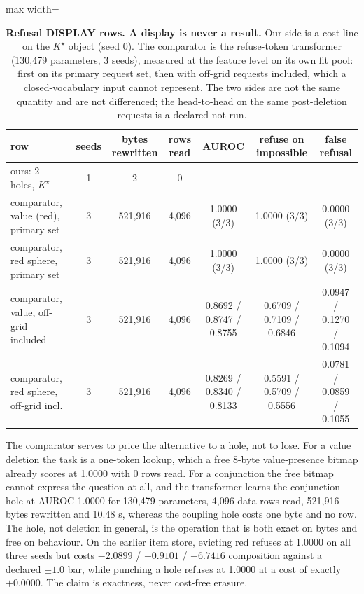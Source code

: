 \documentclass{article} %
\newcommand{\Kstar}{\ensuremath{K^{\star}}}
\begin{document}
\begin{table}[t]
\centering\small
\caption{\textbf{Refusal DISPLAY rows. A display is never a result.} Our side is a cost line
on the $\Kstar$ object (seed 0). The comparator is the refuse-token transformer (130,479
parameters, 3 seeds), measured at the feature level on its own fit pool: first on its primary
request set, then with off-grid requests included, which a closed-vocabulary input cannot
represent. The two sides are not the same quantity and are not differenced; the head-to-head on
the same post-deletion requests is a declared not-run.}
\label{tab:hole}
\setlength{\tabcolsep}{3pt}
\begin{adjustbox}{max width=\linewidth}\begin{tabular}{lcccccc}
\toprule
row & seeds & bytes rewritten & rows read & AUROC & refuse on impossible & false refusal \\
\midrule
ours: 2 holes, $\Kstar$ & 1 & 2 & 0 & --- & --- & --- \\ %
comparator, value (red), primary set & 3 & 521,916 & 4,096 & 1.0000 (3/3) & 1.0000 (3/3) & 0.0000 (3/3) \\
comparator, red sphere, primary set & 3 & 521,916 & 4,096 & 1.0000 (3/3) & 1.0000 (3/3) & 0.0000 (3/3) \\
comparator, value, off-grid included & 3 & 521,916 & 4,096 & 0.8692 / 0.8747 / 0.8755 & 0.6709 / 0.7109 / 0.6846 & 0.0947 / 0.1270 / 0.1094 \\
comparator, red sphere, off-grid incl. & 3 & 521,916 & 4,096 & 0.8269 / 0.8340 / 0.8133 & 0.5591 / 0.5709 / 0.5556 & 0.0781 / 0.0859 / 0.1055 \\
\bottomrule
\end{tabular}\end{adjustbox}
\end{table}

\noindent The comparator serves to price the alternative to a hole, not to lose. For a value
deletion the task is a one-token lookup, which a free 8-byte value-presence bitmap already scores
at 1.0000 with 0 rows read. For a conjunction the free bitmap cannot express the question at
all, and the transformer learns the conjunction hole at AUROC 1.0000 for 130,479 parameters,
4,096 data rows read, 521,916 bytes rewritten and 10.48 s, whereas the coupling hole costs one
byte and no row. %
\noindent The hole, not deletion in general, is the operation that is both exact on bytes and
free on behaviour. On the earlier item store, evicting red refuses at 1.0000 on all three
seeds but costs $-2.0899$ / $-0.9101$ / $-6.7416$ composition against a declared $\pm1.0$ bar,
while punching a hole refuses at 1.0000 at a cost of exactly $+0.0000$. %
The claim is exactness, never cost-free erasure.
\end{document}
